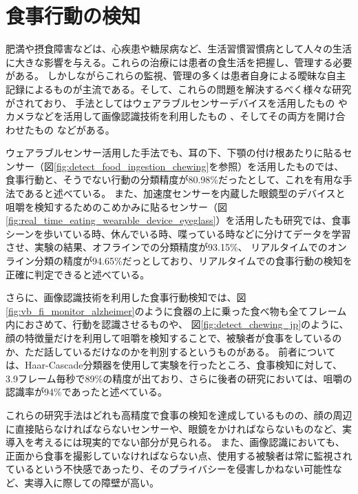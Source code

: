 \section{食事行動の検知}

肥満や摂食障害などは、心疾患や糖尿病など、生活習慣習慣病として人々の生活に大きな影響を与える。これらの治療には患者の食生活を把握し、管理する必要がある。
しかしながらこれらの監視、管理の多くは患者自身による曖昧な自主記録によるものが主流である。そして、これらの問題を解決するべく様々な研究がされており、
手法としてはウェアラブルセンサーデバイスを活用したもの \cite{wrist_motion_eating_detection} \cite{novel_wearable_device_monitor_ingestion} \cite{detect_eating_drinking_arm_gestures}
\cite{real_time_eating_wearable_device_eyeglass} \cite{eating_gestures_hidden_markov_models} \cite{detect_food_ingestion_chewing}や
カメラなどを活用して画像認識技術を利用したもの \cite{vb_fi_monitor_alzheimer} \cite{vb_fi_monitor_robot} \cite{vb_fi_monitor_mobile} 、そしてその両方を開け合わせたもの \cite{fi_monitor_camera_microphone} などがある。

ウェアラブルセンサー活用した手法でも、耳の下、下顎の付け根あたりに貼るセンサー（図\ref{fig:detect_food_ingestion_chewing}を参照）を活用したもの\cite{detect_food_ingestion_chewing}では、食事行動と、そうでない行動の分類精度が80.98\%だったとして、これを有用な手法であると述べている。
また、加速度センサーを内蔵した眼鏡型のデバイスと咀嚼を検知するためのこめかみに貼るセンサー（図\ref{fig:real_time_eating_wearable_device_eyeglass}）を活用したも研究\cite{real_time_eating_wearable_device_eyeglass}では、食事シーンを歩いている時、休んでいる時、喋っている時などに分けてデータを学習させ、実験の結果、オフラインでの分類精度が93.15\%、
リアルタイムでのオンライン分類の精度が94.65\%だっとしており、リアルタイムでの食事行動の検知を正確に判定できると述べている。

さらに、画像認識技術を利用した食事行動検知では、図\ref{fig:vb_fi_monitor_alzheimer}のように食器の上に乗った食べ物も全てフレーム内におさめて、行動を認識させるもの\cite{vb_fi_monitor_alzheimer}や、
図\ref{fig:detect_chewing_jp}のように、顔の特徴量だけを利用して咀嚼を検知することで、被験者が食事をしているのか、ただ話しているだけなのかを判別する\cite{detect_chewing_jp}というものがある。
前者\cite{vb_fi_monitor_alzheimer}については、Haar-Cascade分類器を使用して実験を行ったところ、食事検知に対して、3.9フレーム毎秒で89\%の精度が出ており、さらに後者の研究\cite{detect_chewing_jp}においては、咀嚼の認識率が94\%であったと述べている。

これらの研究手法はどれも高精度で食事の検知を達成しているものの、顔の周辺に直接貼らなければならないセンサーや、眼鏡をかければならないものなど、実導入を考えるには現実的でない部分が見られる。
また、画像認識においても、正面から食事を撮影していなければならない点、使用する被験者は常に監視されているという不快感であったり、そのプライバシーを侵害しかねない可能性など、実導入に際しての障壁が高い。

